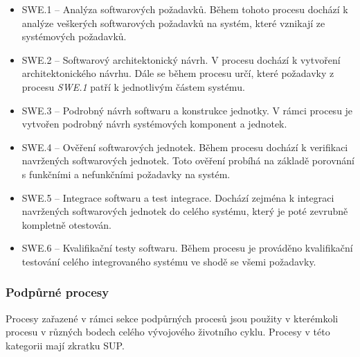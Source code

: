 \documentclass[czech,master,public,dept460,male,cpdeclaration,oneside]{diploma}
\begin{document}
\begin{itemize}
	\item SWE.1 -- Analýza softwarových požadavků. Během tohoto procesu dochází k analýze veškerých softwarových požadavků na systém, které vznikají ze systémových požadavků.
	\item SWE.2 -- Softwarový architektonický návrh. V procesu dochází k vytvoření architektonického návrhu. Dále se během procesu určí, které požadavky z procesu \textit{SWE.1} patří k jednotlivým částem systému. 
	\item SWE.3 -- Podrobný návrh softwaru a konstrukce jednotky. V rámci procesu je vytvořen podrobný návrh systémových komponent a jednotek.
	\item SWE.4 -- Ověření softwarových jednotek. Během procesu dochází k verifikaci navržených softwarových jednotek. Toto ověření probíhá na základě porovnání s funkčními a nefunkčními požadavky na systém.
	\item SWE.5 -- Integrace softwaru a test integrace. Dochází zejména k integraci navržených softwarových jednotek do celého systému, který je poté zevrubně kompletně otestován. 
	\item SWE.6 -- Kvalifikační testy softwaru. Během procesu je prováděno kvalifikační testování celého integrovaného systému ve shodě se všemi požadavky.
\end{itemize}

\subsubsection{Podpůrné procesy}
Procesy zařazené v rámci sekce podpůrných procesů jsou použity v kterémkoli procesu v různých bodech celého vývojového životního cyklu. Procesy v této kategorii mají zkratku SUP.
\end{document}
